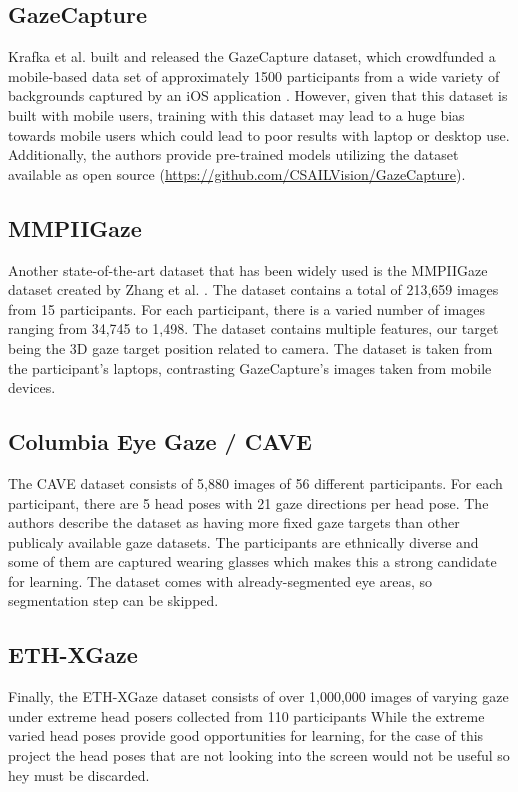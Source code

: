 \subsection{GazeCapture}
Krafka et al. built and released the GazeCapture dataset, which crowdfunded a mobile-based data set of approximately 1500 participants from a wide variety of backgrounds captured by an iOS application \cite{GazeCapture}. However, given that this dataset is built with mobile users, training with this dataset may lead to a huge bias towards mobile users which could lead to poor results with laptop or desktop use.
Additionally, the authors provide pre-trained models utilizing the dataset available as open source (\url{https://github.com/CSAILVision/GazeCapture}).

\subsection{MMPIIGaze}
Another state-of-the-art dataset that has been widely used is the MMPIIGaze dataset created by Zhang et al. \cite{GazeEstimationInTheWild}.
The dataset contains a total of 213,659 images from 15 participants. For each participant, there is a varied number of
images ranging from 34,745 to 1,498. The dataset contains multiple features, our target being the 3D gaze target position related to camera.
The dataset is taken from the participant's laptops, contrasting GazeCapture's images taken from mobile devices.

\subsection{Columbia Eye Gaze / CAVE}
The CAVE dataset \cite{CAVE_0324} consists of 5,880 images of 56 different participants. For each participant, there are 5 head poses with 21 gaze directions per head pose. The authors describe the dataset as having more fixed gaze targets than other publicaly available gaze datasets. The participants are ethnically diverse and some of them are captured wearing glasses which makes this a strong candidate for learning. The dataset comes with already-segmented eye areas, so segmentation step can be skipped.

\subsection{ETH-XGaze}
Finally, the ETH-XGaze dataset \cite{Zhang2020ETHXGaze} consists of over 1,000,000 images of varying gaze under extreme head posers collected from 110 participants While the extreme varied head poses provide good opportunities for learning, for the case of this project the head poses that are not looking into the screen would not be useful so hey must be discarded.


